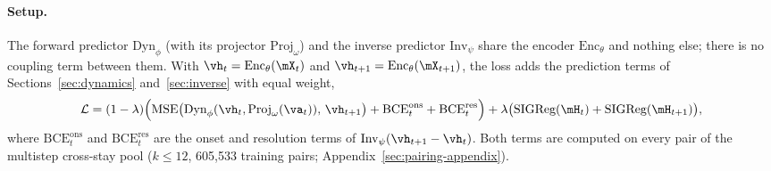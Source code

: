 \paragraph{Setup.} The forward predictor $\text{Dyn}_\phi$ (with its projector $\text{Proj}_\omega$) and the inverse predictor $\text{Inv}_\psi$ share the encoder $\text{Enc}_\theta$ and nothing else; there is no coupling term between them. With $\vh_t=\text{Enc}_\theta(\mX_t)$ and $\vh_{t+1}=\text{Enc}_\theta(\mX_{t+1})$, the loss adds the prediction terms of Sections~\ref{sec:dynamics} and~\ref{sec:inverse} with equal weight,
\[
\mathcal{L} = (1-\lambda)\Big(\text{MSE}\big(\text{Dyn}_\phi(\vh_t,\text{Proj}_\omega(\va_t)),\,\vh_{t+1}\big) + \text{BCE}^{\text{ons}}_t + \text{BCE}^{\text{res}}_t\Big) + \lambda\big(\text{SIGReg}(\mH_t)+\text{SIGReg}(\mH_{t+1})\big),
\]
where $\text{BCE}^{\text{ons}}_t$ and $\text{BCE}^{\text{res}}_t$ are the onset and resolution terms of $\text{Inv}_\psi(\vh_{t+1}-\vh_t)$. Both terms are computed on every pair of the multistep cross-stay pool ($k\le12$, 605{,}533 training pairs; Appendix~\ref{sec:pairing-appendix}). 

